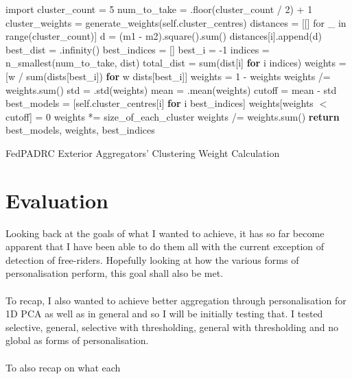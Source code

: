 \begin{algorithm}[H]
\SetAlgoLined
\DontPrintSemicolon
{}
\newcommand\mycommfont[1]{\footnotesize\ttfamily\textcolor{blue}{#1}}
 import \KwMath\;
 \;
 cluster\_count = 5\;
 num\_to\_take = \KwMath.floor(cluster\_count / 2) + 1\;
 cluster\_weights = generate\_weights(self.cluster\_centres)\;
 distances = [[] for \_ in range(cluster\_count)]\;
 \;
  {
   {
   d = (m1 - m2).square().sum()\;
   distances[i].append(d)\;
  }
 }
 \;
 best\_dist = \KwMath.infinity()\;
 best\_indices = []\;
 best\_i = -1\;
 \;
  {
  indices = n\_smallest(num\_to\_take, dist)\;
  total\_dist = sum(dist[i] \textbf{for} i \KwIn indices)\;
  \;
 }
 \;
 weights = [w / sum(dists[best\_i]) \textbf{for} w \KwIn dists[best\_i]]\;
 weights = 1 - weights\;
 weights /= weights.sum()\;
 \;
 std = \KwMath.std(weights)\;
 mean = \KwMath.mean(weights)\;
 cutoff = mean - std\;
 \;
 best\_models = [self.cluster\_centres[i] \textbf{for} i \KwIn best\_indices]\;
 weights[weights $<$ cutoff] = 0\;
 weights *= size\_of\_each\_cluster\;
 weights /= weights.sum()\;
 \;
 \textbf{return} best\_models, weights, best\_indices\;

 \caption{FedPADRC Exterior Aggregators' Clustering Weight Calculation}
 \label{alg:my_alg}
\end{algorithm}




\section{Evaluation}
Looking back at the goals of what I wanted to achieve, it has so far become apparent that I have been able to do them all with the current exception of detection of free-riders.
Hopefully looking at how the various forms of personalisation perform, this goal shall also be met.
\\ \\
To recap, I also wanted to achieve better aggregation through personalisation for 1D PCA as well as in general and so I will be initially testing that.
I tested selective, general, selective with thresholding, general with thresholding and no global as forms of personalisation.
\\ \\
To also recap on what each

